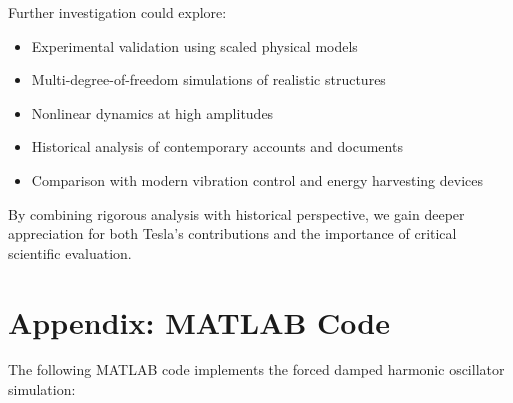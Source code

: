 \documentclass[12pt,a4paper]{article}
\begin{document}
Further investigation could explore:
\begin{itemize}
\item Experimental validation using scaled physical models
\item Multi-degree-of-freedom simulations of realistic structures
\item Nonlinear dynamics at high amplitudes
\item Historical analysis of contemporary accounts and documents
\item Comparison with modern vibration control and energy harvesting devices
\end{itemize}

By combining rigorous analysis with historical perspective, we gain deeper appreciation for both Tesla's contributions and the importance of critical scientific evaluation.

\newpage

\section*{Appendix: MATLAB Code}

The following MATLAB code implements the forced damped harmonic oscillator simulation:
\end{document}
